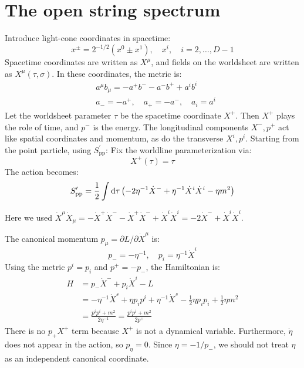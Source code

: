 \section{\texorpdfstring{The open string spectrum}{The open string spectrum}}  \label{sec:1.3}
Introduce light-cone coordinates in spacetime: 
\begin{equation}
	x^{\pm}=2^{-1 / 2}\left(x^{0} \pm x^{1}\right), \quad x^{i},\quad  i=2, \ldots, D-1
\end{equation}
Spacetime coordinates are written as $X^\mu$, and fields on the worldsheet are written as $X^\mu(\tau, \sigma)$. 
In these coordinates, the metric is: 
\begin{subequations} \label{1.3.2} %
	\begin{align}
		&a^{\mu} b_{\mu}=-a^{+} b^{-}-a^{-} b^{+}+a^{i} b^{i} \\
		&a_{-}=-a^{+}, \quad a_{+}=-a^{-}, \quad a_{i}=a^{i}
	\end{align} 
\end{subequations}
Let the worldsheet parameter $\tau$ be the spacetime coordinate $X^+$. Then $X^+$ plays the role of time, and $p^-$ is the energy. The longitudinal components $X^-, p^+$ act like spatial coordinates and momentum, as do the transverse $X^i, p^i$. 
Starting from the point particle, using $S_{\mathrm{pp}}^\prime$: 
Fix the worldline parameterization via: 
\begin{equation}
	X^+(\tau)=\tau
\end{equation}
The action becomes: 
\begin{equation}
	S_{\mathrm{pp}}^{\prime}=\frac{1}{2} \int \mathrm{d}\tau\left(-2 \eta^{-1} \dot{X}^{-}+\eta^{-1} \dot{X}^{i} \dot{X}^{i}-\eta m^{2}\right)
\end{equation}
\begin{tcolorbox}
	\begin{remark}
		Here we used $\dot{X}^{\mu} \dot{X}_{\mu}=-\dot{X}^{+} \dot{X}^{-}-\dot{X}^{+} \dot{X}^{-}+\dot{X}^{i} \dot{X}^{i}=-2 \dot{X}^{-}+\dot{X}^{i} \dot{X}^{i}$. 
	\end{remark}
\end{tcolorbox}
\noindent The canonical momentum $p_{\mu}=\partial L / \partial \dot{X}^{\mu}$ is: 
\begin{equation}
	p_{-}=-\eta^{-1}, \quad p_{i}=\eta^{-1} \dot{X}^{i}
\end{equation}
Using the metric $p^i=p_i$ and $p^+=-p_-$, the Hamiltonian is: 
\begin{equation}
	\begin{aligned}
		H &=p_{-} \dot{X}^{-}+p_{i} \dot{X}^{i}-L \\
		&=-\eta^{-1}\dot{X}^s +\eta p_i p^i +\eta^{-1}\dot{X}^s -\tfrac{1}{2}\eta p_i p_i +\tfrac{1}{2}\eta m^2 \\
		&=\frac{p^{i} p^{i}+m^{2}}{2 \eta^{-1}}=\frac{p^{i} p^{i}+m^{2}}{2 p^{+}}\label{string-H}
	\end{aligned}
\end{equation}
There is no $p_+ X^+$ term because $X^+$ is not a dynamical variable. 
Furthermore, $\dot{\eta}$ does not appear in the action, so $p_\eta=0$. Since $\eta=-1/p_{-}$, we should not treat $\eta$ as an independent canonical coordinate. 

